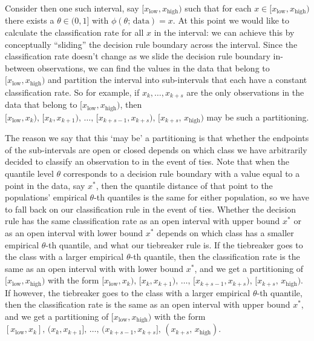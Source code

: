 Consider then one such interval, say
$[x_{\scriptscriptstyle\text{low}}, x_{\scriptscriptstyle\text{high}})$ such
that for each
$x \in [x_{\scriptscriptstyle\text{low}}, x_{\scriptscriptstyle\text{high}})$
there exists a $\theta \in (0, 1]$ with $\phi(\theta;\, \text{data}) = x$.  At
this point we would like to calculate the classification rate for all $x$ in the
interval: we can achieve this by conceptually ``sliding'' the decision rule
boundary across the interval.  Since the classification rate doesn't change as
we slide the decision rule boundary in-between observations, we can find the
values in the data that belong to
$[x_{\scriptscriptstyle\text{low}}, x_{\scriptscriptstyle\text{high}})$ and
partition the interval into sub-intervals that each have a constant
classification rate.  So for example, if $x_k, \dots, x_{k+s}$ are the only
observations in the data that belong to
$[x_{\scriptscriptstyle\text{low}}, x_{\scriptscriptstyle\text{high}})$, then
$[x_{\scriptscriptstyle\text{low}}, x_k),\, [x_k, x_{k+1}),\, \dots,\,
[x_{k+s-1}, x_{k+s}),\, [x_{k+s},\, x_{\scriptscriptstyle\text{high}})$ may be
such a partitioning.

The reason we say that this `may be' a partitioning is that whether the
endpoints of the sub-intervals are open or closed depends on which class we have
arbitrarily decided to classify an observation to in the event of ties.  Note
that when the quantile level $\theta$ corresponds to a decision rule boundary
with a value equal to a point in the data, say $x^{*}$, then the quantile
distance of that point to the populations' empirical $\theta$-th quantiles is
the same for either population, so we have to fall back on our classification
rule in the event of ties.  Whether the decision rule has the same
classification rate as an open interval with upper bound $x^{*}$ or as an open
interval with lower bound $x^{*}$ depends on which class has a smaller empirical
$\theta$-th quantile, and what our tiebreaker rule is.  If the tiebreaker goes
to the class with a larger empirical $\theta$-th quantile, then the
classification rate is the same as an open interval with with lower bound
$x^{*}$, and we get a partitioning of
$[x_{\scriptscriptstyle\text{low}}, x_{\scriptscriptstyle\text{high}})$ with the
form
$[x_{\scriptscriptstyle\text{low}}, x_k),\, [x_k, x_{k+1}),\, \dots,\,
[x_{k+s-1}, x_{k+s}),\, [x_{k+s},\, x_{\scriptscriptstyle\text{high}})$.  If
however, the tiebreaker goes to the class with a larger empirical $\theta$-th
quantile, then the classification rate is the same as an open interval with
upper bound $x^{*}$, and we get a partitioning of
$[x_{\scriptscriptstyle\text{low}}, x_{\scriptscriptstyle\text{high}})$ with the
form
$[x_{\scriptscriptstyle\text{low}}, x_k],\, (x_k, x_{k+1}],\, \dots,\,
(x_{k+s-1}, x_{k+s}],\, (x_{k+s},\, x_{\scriptscriptstyle\text{high}})$.

